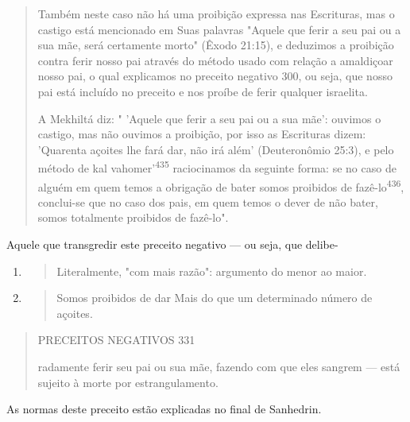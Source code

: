 \begin{quote}
Também neste caso não há uma proibição expressa nas Escrituras, mas o
castigo está mencionado em Suas palavras "Aquele que ferir a seu pai ou
a sua mãe, será certamente morto" (Êxodo 21:15), e deduzimos a proibição
contra ferir nosso pai através do método usado com relação a amaldiçoar
nos­so pai, o qual explicamos no preceito negativo 300, ou seja, que
nosso pai está incluído no preceito e nos proíbe de ferir qualquer
israelita.

A Mekhiltá diz: " 'Aquele que ferir a seu pai ou a sua mãe': ouvimos o
castigo, mas não ouvimos a proibição, por isso as Escrituras dizem:
'Quaren­ta açoites lhe fará dar, não irá além' (Deuteronômio 25:3), e
pelo método de kal vahomer'\textsuperscript{435} raciocinamos da
seguinte forma: se no caso de alguém em quem temos a obrigação de bater
somos proibidos de fazê-lo\textsuperscript{436}, conclui-se que no caso
dos pais, em quem temos o dever de não bater, somos totalmente
proi­bidos de fazê-lo".
\end{quote}

Aquele que transgredir este preceito negativo --- ou seja, que delibe-

\begin{enumerate}
\def\labelenumi{\arabic{enumi}.}
\setcounter{enumi}{434}
\item
 \begin{quote}
 Literalmente, "com mais razão": argumento do menor ao maior.
 \end{quote}
\item
 \begin{quote}
 Somos proibidos de dar Mais do que um determinado número de açoites.
 \end{quote}
\end{enumerate}

\begin{quote}
PRECEITOS NEGATIVOS 331

radamente ferir seu pai ou sua mãe, fazendo com que eles sangrem ---
está su­jeito à morte por estrangulamento.
\end{quote}

As normas deste preceito estão explicadas no final de Sanhedrin.

